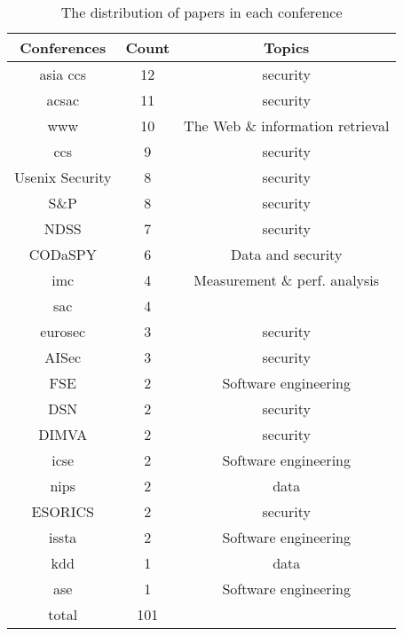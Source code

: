 \begin{table}
	\label{tbl:literature_confs}
	\caption{The distribution of papers in each conference}
	\begin{tabular}{|c|c|c|}
\hline
Conferences & Count & Topics\\\hline
asia ccs & 12 & security\\\hline
acsac & 11 & security\\\hline
www & 10 & The Web \& information retrieval\\\hline
ccs & 9 & security\\\hline
Usenix Security & 8 & security\\\hline
S\&P & 8 & security\\\hline
NDSS & 7 & security\\\hline
CODaSPY & 6 & Data and security\\\hline
imc & 4 & Measurement \& perf. analysis\\\hline
sac & 4 & \\\hline
eurosec & 3 & security\\\hline
AISec & 3 & security\\\hline
FSE & 2 & Software engineering\\\hline
DSN & 2 & security\\\hline
DIMVA & 2 & security\\\hline
icse & 2 & Software engineering\\\hline
nips & 2 & data\\\hline
ESORICS & 2 & security\\\hline
issta & 2 & Software engineering\\\hline
kdd & 1 & data\\\hline
ase & 1 & Software engineering\\\hline
total & 101 & \\\hline
	\end{tabular}
\end{table}